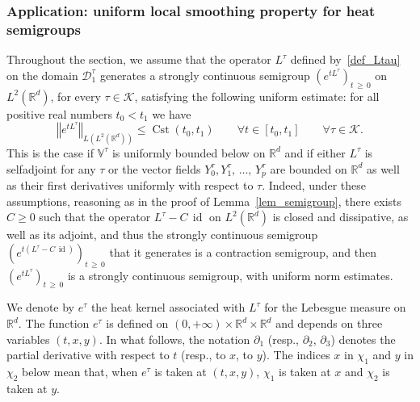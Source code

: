 \documentclass[AHL,Unicode,published]{cedram}
\newcommand*\R{\mathbb{R}}
\newcommand{\bbV}{\mathbb{V}}
\newcommand{\calK}{\mathcal{K}}
\newcommand{\calD}{\mathcal{D}}
\DeclareMathOperator{\Cst}{Cst}
\DeclareMathOperator{\id}{id}
\renewcommand{\geq}{\geqslant}
\renewcommand{\leq}{\leqslant}
\let\oldforall\forall
\renewcommand*{\forall}{\mathrel{\oldforall}}
\begin{document}
\subsubsection{Application: uniform local smoothing property for heat semigroups}\label{sec:localregheat}
Throughout the section, we assume that the operator $L^\tau$ defined by~\eqref{def_Ltau} on the domain $\calD^\tau_1$ generates a strongly continuous semigroup $(e^{tL^\tau})_{t\,\geq \,0}$ on $L^2(\R^d)$, for every $\tau\in\calK$, satisfying the following uniform estimate: for all positive real numbers $t_0<t_1$ we have
\begin{equation}\label{uniformestimatesemigroup0}
\left\Vert e^{tL^\tau} \right\Vert_{L\left(L^2\left(\R^d\right)\right)}\leq\Cst(t_0,t_1) \qquad\forall t\in[t_0,t_1]\qquad \forall \tau\in\calK.
\end{equation}
This is the case if $\bbV^\tau$ is uniformly bounded below on $\R^d$ and if either $L^\tau$ is selfadjoint for any $\tau$ or the vector fields $Y_0^\tau,Y_1^\tau,\,\ldots,\,Y_p^\tau$ are bounded on $\R^d$ as well as their first derivatives uniformly with respect to $\tau$. Indeed, under these assumptions, reasoning as in the proof of Lemma~\ref{lem_semigroup}, there exists $C\geq 0$ such that the operator $L^\tau-C\,\id$ on $L^2(\R^d)$ is closed and dissipative, as well as its adjoint, and thus the strongly continuous semigroup $(e^{t(L^\tau-C\,\id)})_{t\,\geq\,0}$ that it generates is a contraction semigroup, and then $(e^{tL^\tau})_{t\,\geq\,0}$ is a strongly continuous semigroup, with uniform norm estimates.

We denote by $e^\tau$ the heat kernel associated with $L^\tau$ for the Lebesgue measure on $\R^d$. The function $e^\tau$ is defined on $(0,+\infty)\times\R^d\times\R^d$ and depends on three variables $(t,x,y)$. In what follows, the notation $\partial_1$ (resp., $\partial_2$, $\partial_3$) denotes the partial derivative with respect to $t$ (resp., to $x$, to $y$). The indices $x$ in $\chi_1$ and $y$ in $\chi_2$ below mean that, when $e^\tau$ is taken at $(t,x,y)$, $\chi_1$ is taken at $x$ and $\chi_2$ is taken at $y$.
\end{document}
